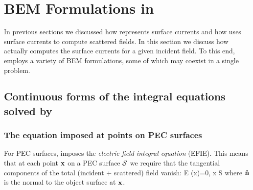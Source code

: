 
\newpage
\section{BEM Formulations in \ls}

In previous sections we discussed how \lss represents
surface currents and how \lss uses surface currents to 
compute scattered fields. In this section we discuss
how \lss actually computes the surface currents for a 
given incident field. To this end, \lss employs a 
variety of BEM formulations, some of which may coexist
in a single problem.

\subsection{Continuous forms of the integral equations
            solved by \lss}

\subsubsection{The equation imposed at points on PEC surfaces}

For PEC surfaces, \lss imposes the \textit{electric field
integral equation} (EFIE). This means that at each point 
$\mathbf{x}$ on a PEC surface $\mathcal{S}$ we require that the tangential 
components of the total (incident + scattered) field vanish:
{ \times \vb E (\vb x)=0, \qquad
  \vb x \in \mc S 
}
where $\mathbf{\hat n}$ is the normal to the object surface
at $\mathbf{x}$. 

